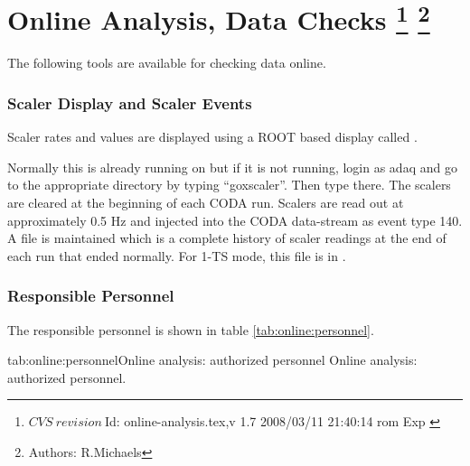 \chapter[Online Analysis, Data Checks]{Online Analysis, Data Checks
\footnote{
  $CVS~revision~ $Id: online-analysis.tex,v 1.7 2008/03/11 21:40:14 rom Exp $ $
}
\footnote{Authors: R.Michaels }
}
 
\par
The following tools are available for checking
data online.


\subsection{Scaler Display and Scaler Events}
Scaler rates and values are displayed using
a ROOT based display called .

Normally this is already running on  but 
if it is not running, login as
adaq and go to the appropriate directory
by typing ``goxscaler''.
Then type  there.  
The scalers are cleared at
the beginning of each CODA run.
Scalers are read out at approximately 0.5 Hz 
and injected into the CODA data-stream 
as event type 140.  A file
 is maintained which is
a complete history of scaler readings at
the end of each run that ended normally.
For 1-TS mode, this file is in .



\begin{safetyen}{10}{15}
\subsection{Responsible  Personnel} 
\end{safetyen}
The responsible personnel is shown in table \ref{tab:online:personnel}.
\begin{namestab}{tab:online:personnel}{Online analysis: authorized personnel}{%
      Online analysis: authorized personnel.}
  \RobertMichaels{}
\end{namestab}

